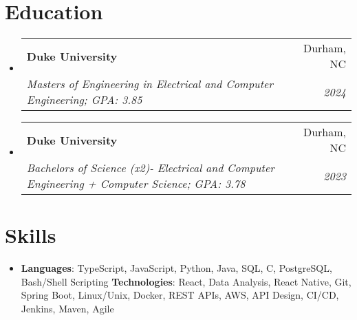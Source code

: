 \documentclass[letterpaper,11pt]{article}
\makeatletter
\newcommand{\resumeSubheading}[4]{
  \vspace{-1pt}\item
    \begin{tabular*}{0.97\textwidth}{l@{\extracolsep{\fill}}r}
      \textbf{#1} & #2 \\
      \textit{\small#3} & \textit{\small #4} \\
    \end{tabular*}\vspace{-5pt}
}
\newcommand{\resumeSubHeadingListStart}{\begin{itemize}[leftmargin=*]}
\newcommand{\resumeSubHeadingListEnd}{\end{itemize}}
\makeatother
\begin{document}
\section{Education}
  \resumeSubHeadingListStart
    \resumeSubheading
      {Duke University}{Durham, NC}
      {Masters of Engineering in Electrical and Computer Engineering;  GPA: 3.85}{2024}
    \resumeSubheading
      {Duke University}{Durham, NC}
      {Bachelors of Science (x2)- Electrical and Computer Engineering + Computer Science;  GPA: 3.78}{2023}
  \resumeSubHeadingListEnd

\section{Skills}
 \resumeSubHeadingListStart
   \item{
     \textbf{Languages}{: TypeScript, JavaScript, Python, Java, SQL, C, PostgreSQL, Bash/Shell Scripting}
     \hfill
     \textbf{Technologies}{: React, Data Analysis, React Native, Git, Spring Boot, Linux/Unix, Docker, REST APIs, AWS, API Design, CI/CD, Jenkins, Maven, Agile}
   }
 \resumeSubHeadingListEnd

\end{document}
